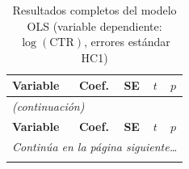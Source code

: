 \small
\begin{longtable}{lcccc}
\caption{Resultados completos del modelo OLS (variable dependiente: $\log(\text{CTR})$,
errores est\'andar HC1)}
\label{tab:ols_full} \\
\toprule
\textbf{Variable} & \textbf{Coef.} & \textbf{SE} & \textbf{$t$} & \textbf{$p$} \\
\midrule
\endfirsthead

\multicolumn{5}{l}{\small\itshape (continuaci\'on)} \\[0.4ex]
\toprule
\textbf{Variable} & \textbf{Coef.} & \textbf{SE} & \textbf{$t$} & \textbf{$p$} \\
\midrule
\endhead

\multicolumn{5}{r}{\small\itshape Contin\'ua en la p\'agina siguiente\ldots} \\
\endfoot

\endlastfoot


\end{longtable}
